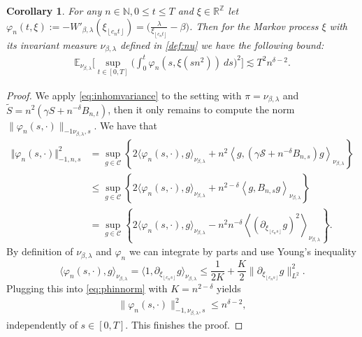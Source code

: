 \documentclass[a4paper, reqno, 12pt]{amsart}
\theoremstyle{plain}
\newtheorem{corollary}[definition]{Corollary}
\theoremstyle{definition}
\newcommand{\floor}[1]{\left\lfloor #1 \right\rfloor}
\newcommand{\R}{\mathbb{R}}
\newcommand{\Z}{\mathbb{Z}}
\newcommand{\N}{\mathbb{N}}
\begin{document}
\begin{corollary} \label{cor:h-1heatbath}
For any $n\in\N, 0\leq t \le T$ and $\xi\in \R^{\Z}$ let $\varphi_n(t,\xi):= -W'_{\beta,\lambda}(\xi_{\floor{c_nt}}) =  \big (\tfrac{\lambda}{\xi_{\floor{c_n t}}}-\beta\big)$. Then for the Markov process $\xi$ with its invariant measure $\nu_{\beta,\lambda}$ defined in \eqref{def:nu} we have the following bound: 
\begin{align*}
\mathbb E_{\nu_{\beta,\lambda}} \Big[ \sup_{t\in[0,T]} \Big( \int_0^t \varphi_n(s,\xi(sn^2))\ ds \Big)^2 \Big]\lesssim T^2n^{\delta-2}.
\end{align*}
\end{corollary}
\begin{proof}
    We apply \eqref{eq:inhomvariance} to the setting with $\pi =\nu_{\beta,\lambda}$ and $\tilde S = n^2(\gamma S+ n^{-\delta}B_{n,t})$, then it only remains to compute the norm $\|\varphi_n(s,\cdot)\|_{-1\nu_{\beta,\lambda},s}$.
    We have that
    \begin{equation} \label{eq:phinnorm}
    \begin{split}
        \Vert \varphi_n(s,\cdot) \Vert_{-1,n,s}^2 &=\sup_{g\in \mathcal C} \left\{ 2 \langle \varphi_n(s,\cdot), g \rangle_{\nu_{\beta,\lambda}} +  n^2 \left\langle g, (\gamma \mathcal S + n^{-\delta}B_{n,s}) g \right\rangle_{\nu_{\beta,\lambda}}  \right\}\\
        &\le \sup_{g\in \mathcal C} \left\{ 2 \langle \varphi_n(s,\cdot) , g \rangle_{\nu_{\beta,\lambda}} +  n^{2-\delta} \left\langle g, B_{n,s} g \right\rangle_{\nu_{\beta,\lambda}}  \right\}\\
        &= \sup_{g\in \mathcal C} \left\{ 2 \langle \varphi_n(s,\cdot) , g \rangle_{\nu_{\beta,\lambda}} -  n^2n^{-\delta}  \left\langle \left( \partial_{\xi_{\floor{c_n s}}} g \right)^2\right\rangle_{\nu_{\beta,\lambda}}  \right\}.
        \end{split}
        \end{equation}
    By definition of $\nu_{\beta,\lambda}$ and $\varphi_n$ we can integrate by parts and use Young's inequality
    \begin{equation*}
        \langle\varphi_n(s,\cdot),g\rangle_{\nu_{\beta,\lambda}} =  \langle1,\partial_{\xi_{\floor{c_ns}}}g\rangle_{\nu_{\beta,\lambda}} \leq \frac{1}{2K}+ \frac{K}{2}\|\partial_{\xi_{\floor{c_ns}}}g\|_{L^2}^2.
    \end{equation*}
    Plugging this into \eqref{eq:phinnorm} with $K= n^{2-\delta}$ yields
    \begin{align*}
        \|\varphi_n(s,\cdot)\|^2_{-1,\nu_{\beta,\lambda},s} \leq n^{\delta-2},
    \end{align*}
    independently of $s\in[0,T]$. This finishes the proof.
    \end{proof}
\end{document}
